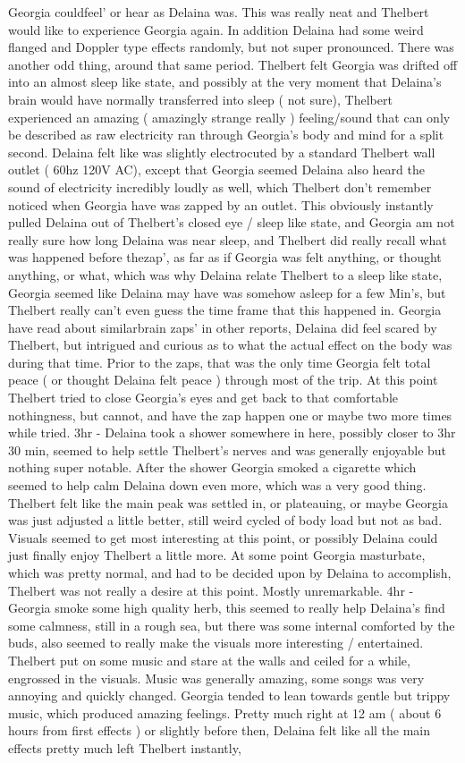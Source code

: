 \documentclass[12pt]{book}
\begin{document}
Georgia couldfeel' or hear as Delaina was. This was really neat and Thelbert would like to experience Georgia again. In addition Delaina had some weird flanged and Doppler type effects randomly, but not super pronounced. There was another odd thing, around that same period. Thelbert felt Georgia was drifted off into an almost sleep like state, and possibly at the very moment that Delaina's brain would have normally transferred into sleep ( not sure), Thelbert experienced an amazing ( amazingly strange really ) feeling/sound that can only be described as raw electricity ran through Georgia's body and mind for a split second. Delaina felt like was slightly electrocuted by a standard Thelbert wall outlet ( 60hz 120V AC), except that Georgia seemed Delaina also heard the sound of electricity incredibly loudly as well, which Thelbert don't remember noticed when Georgia have was zapped by an outlet. This obviously instantly pulled Delaina out of Thelbert's closed eye / sleep like state, and Georgia am not really sure how long Delaina was near sleep, and Thelbert did really recall what was happened before thezap', as far as if Georgia was felt anything, or thought anything, or what, which was why Delaina relate Thelbert to a sleep like state, Georgia seemed like Delaina may have was somehow asleep for a few Min's, but Thelbert really can't even guess the time frame that this happened in. Georgia have read about similarbrain zaps' in other reports, Delaina did feel scared by Thelbert, but intrigued and curious as to what the actual effect on the body was during that time. Prior to the zaps, that was the only time Georgia felt total peace ( or thought Delaina felt peace ) through most of the trip. At this point Thelbert tried to close Georgia's eyes and get back to that comfortable nothingness, but cannot, and have the zap happen one or maybe two more times while tried. 3hr - Delaina took a shower somewhere in here, possibly closer to 3hr 30 min, seemed to help settle Thelbert's nerves and was generally enjoyable but nothing super notable. After the shower Georgia smoked a cigarette which seemed to help calm Delaina down even more, which was a very good thing. Thelbert felt like the main peak was settled in, or plateauing, or maybe Georgia was just adjusted a little better, still weird cycled of body load but not as bad. Visuals seemed to get most interesting at this point, or possibly Delaina could just finally enjoy Thelbert a little more. At some point Georgia masturbate, which was pretty normal, and had to be decided upon by Delaina to accomplish, Thelbert was not really a desire at this point. Mostly unremarkable. 4hr - Georgia smoke some high quality herb, this seemed to really help Delaina's find some calmness, still in a rough sea, but there was some internal comforted by the buds, also seemed to really make the visuals more interesting / entertained. Thelbert put on some music and stare at the walls and ceiled for a while, engrossed in the visuals. Music was generally amazing, some songs was very annoying and quickly changed. Georgia tended to lean towards gentle but trippy music, which produced amazing feelings. Pretty much right at 12 am ( about 6 hours from first effects ) or slightly before then, Delaina felt like all the main effects pretty much left Thelbert instantly, 
\end{document}
